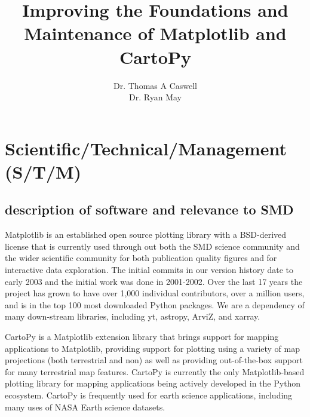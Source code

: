 \documentclass[12pt]{article}
\numberwithin{page}{section}
\begin{document}
\title{Improving the Foundations and Maintenance of Matplotlib and CartoPy}
\author{Dr. Thomas A Caswell\\Dr. Ryan May}
\date{}
\maketitle

\setcounter{tocdepth}{2}
\tableofcontents
\thispagestyle{empty}
\newpage

\section{Scientific/Technical/Management (S/T/M)}
\setcounter{page}{1}

\subsection{description of software and relevance to SMD}

Matplotlib \cite{Hunter:2007} is an established open source plotting
library with a BSD-derived license that is currently used through out
both the SMD science community and the wider scientific community for
both publication quality figures and for interactive data exploration.
The initial commits in our version history date to early 2003 and the
initial work was done in 2001-2002. Over the last 17 years the project
has grown to have over 1,000 individual contributors, over a million
users, and is in the top 100 most downloaded Python packages. We are a
dependency of many down-stream libraries, including yt, astropy,
ArviZ, and xarray.


CartoPy is a Matplotlib extension library that brings support for
mapping applications to Matplotlib, providing support for plotting
using a variety of map projections (both terrestrial and non) as well
as providing out-of-the-box support for many terrestrial map
features. CartoPy is currently the only Matplotlib-based plotting
library for mapping applications being actively developed in the
Python ecosystem. CartoPy is frequently used for earth science
applications, including many uses of NASA Earth science datasets.
\end{document}
